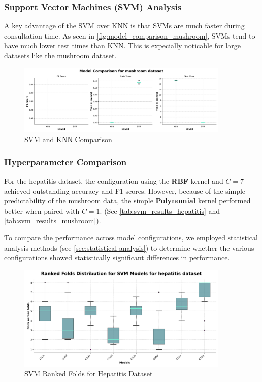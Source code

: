 \subsubsection{Support Vector Machines (SVM) Analysis}
\label{subsubsec:discussion-svm}


A key advantage of the SVM over KNN is that SVMs are much faster during consultation time. As seen in \autoref{fig:model_comparison_mushroom},
SVMs tend to have much lower test times than KNN. This is expecially noticable for large datasets like the mushroom dataset.

\begin{figure}
    \centering
    \includegraphics[width=0.9\textwidth]{figures/model_comparison_mushroom.png}
    \caption{SVM and KNN Comparison}
    \label{fig:model_comparison_mushroom}
\end{figure}


\subsubsection*{Hyperparameter Comparison}

For the hepatitis dataset, the configuration using the \textbf{RBF} kernel and $C=7$
achieved outstanding accuracy and F1 scores. However, because of the simple predictability
of the mushroom data, the simple \textbf{Polynomial} kernel performed better when paired with $C=1$.
(See \autoref{tab:svm_results_hepatitis} and \autoref{tab:svm_results_mushroom}).

To compare the performance across model configurations, we employed statistical analysis methods
(see \autoref{sec:statistical-analysis}) to determine whether the various configurations showed
statistically significant differences in performance.

\begin{figure}
    \centering
    \includegraphics[width=0.9\textwidth]{figures/ranked_folds_SVM_hepatitis.png}
    \caption{SVM Ranked Folds for Hepatitis Dataset}
    \label{fig:ranked_folds_svm_hepatitis}
\end{figure}

